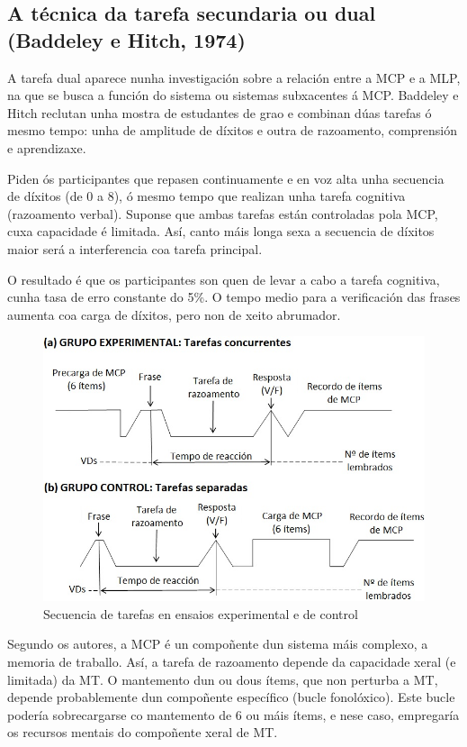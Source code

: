 \documentclass[a4paper,11pt]{article}
\begin{document}
\subsection{A técnica da tarefa secundaria ou dual (Baddeley e Hitch, 1974)}
A tarefa dual aparece nunha investigación sobre a relación entre a MCP e a MLP, na que se busca a función do sistema ou sistemas subxacentes á MCP. Baddeley e Hitch reclutan unha mostra de estudantes de grao e combinan dúas tarefas ó mesmo tempo: unha de amplitude de díxitos e outra de razoamento, comprensión e aprendizaxe.

Piden ós participantes que repasen continuamente e en voz alta unha secuencia de díxitos (de 0 a 8), ó mesmo tempo que realizan unha tarefa cognitiva (razoamento verbal). Suponse que ambas tarefas están controladas pola MCP, cuxa capacidade é limitada. Así, canto máis longa sexa a secuencia de díxitos maior será a interferencia coa tarefa principal. 

O resultado é que os participantes son quen de levar a cabo a tarefa cognitiva, cunha tasa de erro constante do 5\%. O tempo medio para a verificación das frases aumenta coa carga de díxitos, pero non de xeito abrumador.

\newpage

\begin{figure}[h!]
	\centering
	\includegraphics[width=0.6\linewidth]{memoria2_3}
	\caption{Secuencia de tarefas en ensaios experimental e de control}
\end{figure}

Segundo os autores, a MCP é un compoñente dun sistema máis complexo, a memoria de traballo. Así, a tarefa de razoamento depende da capacidade xeral (e limitada) da MT. O mantemento dun ou dous ítems, que non perturba a MT, depende probablemente dun compoñente específico (bucle fonolóxico). Este bucle podería sobrecargarse co mantemento de 6 ou máis ítems, e nese caso, empregaría os recursos mentais do compoñente xeral de MT.
\end{document}
